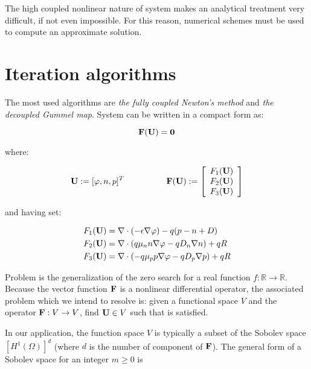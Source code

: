 The high coupled nonlinear nature of system	 makes an analytical treatment very difficult, if not even impossible. For this reason, numerical schemes must be used to  compute an approximate solution. 


\section{Iteration algorithms}

 The most used algorithms are \textit{the fully coupled Newton's method} and \textit{the decoupled Gummel map}. System  can be written in a compact form as:

\begin{equation}
\label{eq: abstract problem fully}
\mathbf{F(U)}=\mathbf{0}
\end{equation}

where:

\begin{equation}
\label{eq: functional operator}
\vect{U}:=[\varphi,n,p]^T \psp{30} \vect{F(U)}:=\left[ \begin{array}{c}
F_1(\vect{U}) \\
F_2(\vect{U}) \\
F_3(\vect{U})
\end{array}
\right]
\end{equation}

and having set:

\begin{align*}
F_1(\mathbf{U}) & = \nabla \cdot (-\epsilon \nabla \varphi) - q(p-n+D) \\
F_2(\mathbf{U}) & = \nabla \cdot ( q\mu_n n \nabla \varphi - qD_n \nabla n )+qR \\
F_3(\mathbf{U}) & = \nabla \cdot (- q\mu_p p \nabla \varphi - qD_p \nabla p )+qR
\end{align*}

Problem  is the generalization of the zero search for a real function $f:\mathbb{R}\rightarrow\mathbb{R}$. Because the vector function $\mathbf{F}$ is a nonlinear differential operator, the associated problem which we intend to resolve is: given a functional space $V$ and the operator $\mathbf{F}:V\rightarrow V$, find $\mathbf{U}\in V$ such that  is satisfied.

In our application, the function space $V$ is typically a subset of the Sobolev space  $[H^1(\Omega)]^d$ (where $d$ is the number of component of $\mathbf{F}$). 
The general form of a Sobolev space for an integer $m\geq 0$ is

